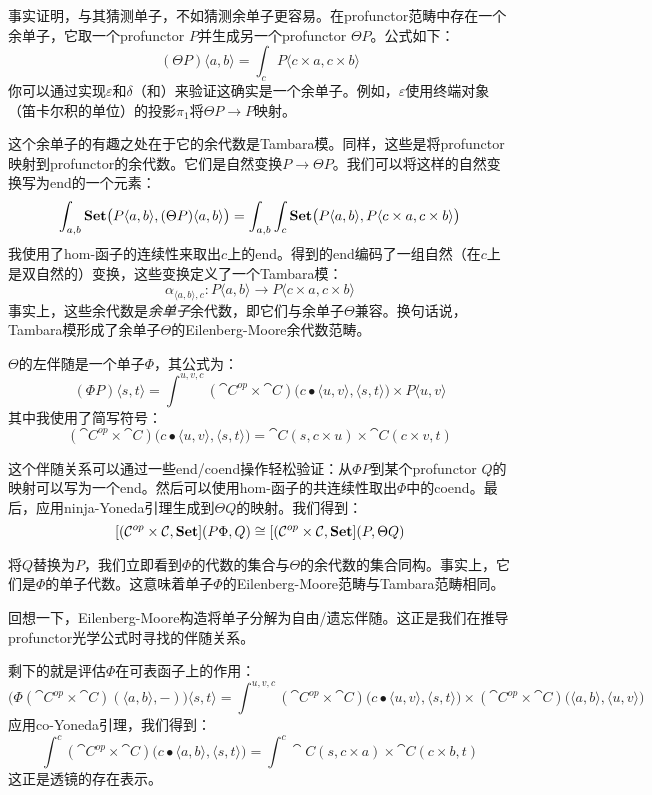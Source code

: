 \documentclass[DaoFP]{subfiles}
\begin{document}
事实证明，与其猜测单子，不如猜测余单子更容易。在profunctor范畴中存在一个余单子，它取一个profunctor $P$并生成另一个profunctor $\Theta P$。公式如下：
\[(\Theta P) \langle a, b \rangle = \int_c P \langle c \times a, c \times b \rangle \]
你可以通过实现$\varepsilon$和$\delta$（和）来验证这确实是一个余单子。例如，$\varepsilon$使用终端对象（笛卡尔积的单位）的投影$\pi_1$将$\Theta P \to P$映射。

这个余单子的有趣之处在于它的余代数是Tambara模。同样，这些是将profunctor映射到profunctor的余代数。它们是自然变换$P \to \Theta P$。我们可以将这样的自然变换写为end的一个元素：
\[\int_{a, b} \mathbf{Set} \big (P \langle a, b \rangle, (\Theta P) \langle a, b \rangle \big) = \int_{a, b} \int_c \mathbf{Set} \big( P\langle a, b \rangle , P \langle c \times a, c \times b \rangle \big) \]
我使用了hom-函子的连续性来取出$c$上的end。得到的end编码了一组自然（在$c$上是双自然的）变换，这些变换定义了一个Tambara模：
\[ \alpha_{\langle a, b\rangle, c} \colon P \langle a, b \rangle \to P \langle c \times a, c \times b \rangle \]
事实上，这些余代数是\emph{余单子}余代数，即它们与余单子$\Theta$兼容。换句话说，Tambara模形成了余单子$\Theta$的Eilenberg-Moore余代数范畴。

$\Theta$的左伴随是一个单子$\Phi$，其公式为：
\[(\Phi P)  \langle s, t \rangle = \int^{u, v, c} (\cat C^{op} \times \cat C) \big(c \bullet \langle u, v\rangle , \langle s, t \rangle\big) \times P \langle u, v \rangle \]
其中我使用了简写符号：
\[ (\cat C^{op} \times \cat C) \big(c \bullet \langle u, v\rangle , \langle s, t \rangle\big) = \cat C(s, c \times u) \times \cat C(c \times v, t) \]

这个伴随关系可以通过一些end/coend操作轻松验证：从$\Phi P$到某个profunctor $Q$的映射可以写为一个end。然后可以使用hom-函子的共连续性取出$\Phi$中的coend。最后，应用ninja-Yoneda引理生成到$\Theta Q$的映射。我们得到：
\[ [(\mathcal{C}^{op} \times \mathcal{C}, \mathbf{Set}] (P \Phi, Q) \cong [(\mathcal{C}^{op} \times \mathcal{C}, \mathbf{Set}] (P, \Theta Q) \]

将$Q$替换为$P$，我们立即看到$\Phi$的代数的集合与$\Theta$的余代数的集合同构。事实上，它们是$\Phi$的单子代数。这意味着单子$\Phi$的Eilenberg-Moore范畴与Tambara范畴相同。

回想一下，Eilenberg-Moore构造将单子分解为自由/遗忘伴随。这正是我们在推导profunctor光学公式时寻找的伴随关系。

剩下的就是评估$\Phi$在可表函子上的作用：
\[ \big( \Phi (\cat C^{op} \times \cat C) (\langle a, b\rangle ,-) \big) \langle s, t\rangle = \int^{u, v, c} (\cat C^{op} \times \cat C) \big(c \bullet \langle u, v\rangle , \langle s, t \rangle \big) \times  (\cat C^{op} \times \cat C) \big(\langle a, b\rangle , \langle u, v\rangle \big)\]
应用co-Yoneda引理，我们得到：
\[ \int^c (\cat C^{op} \times \cat C) \big(c \bullet \langle a, b\rangle , \langle s, t \rangle\big) = \int^c \cat C(s, c \times a) \times \cat C (c \times b, t)\]
这正是透镜的存在表示。
\end{document}
